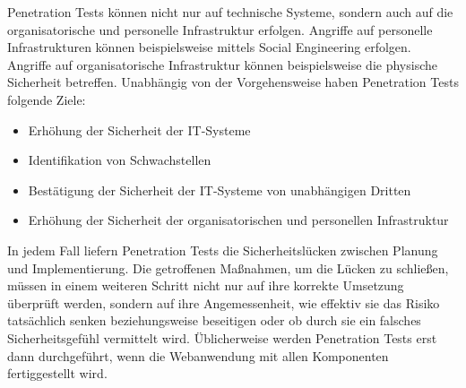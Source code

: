 \documentclass[12pt,oneside,a4paper,parskip]{scrbook}
\begin{document}
    Penetration Tests können nicht nur auf technische Systeme, sondern auch auf die organisatorische und
    personelle Infrastruktur erfolgen. Angriffe auf personelle Infrastrukturen können beispielsweise mittels
    Social Engineering erfolgen. Angriffe auf organisatorische Infrastruktur können beispielsweise die
    physische Sicherheit betreffen.
    Unabhängig von der Vorgehensweise haben Penetration Tests folgende Ziele:
    \begin{itemize}
      \item Erhöhung der Sicherheit der IT-Systeme
      \item Identifikation von Schwachstellen
      \item Bestätigung der Sicherheit der IT-Systeme von unabhängigen Dritten
      \item Erhöhung der Sicherheit der organisatorischen und personellen Infrastruktur
    \end{itemize}

    In jedem Fall liefern Penetration Tests die Sicherheitslücken zwischen Planung und Implementierung. Die
    getroffenen Maßnahmen, um die Lücken zu schließen, müssen in einem weiteren Schritt nicht nur auf ihre
    korrekte Umsetzung überprüft werden, sondern auf ihre Angemessenheit, wie effektiv sie das Risiko
    tatsächlich senken beziehungsweise beseitigen oder ob durch sie ein falsches Sicherheitsgefühl vermittelt
    wird. Üblicherweise werden Penetration Tests erst dann durchgeführt, wenn die Webanwendung mit allen
    Komponenten fertiggestellt wird. \cite{BSI}
\end{document}
